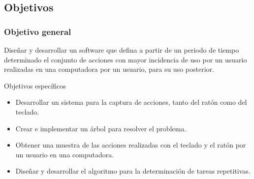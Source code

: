 \subsection{Objetivos} 
\begin{frame}
\frametitle{Objetivo general} 

Dise\~nar y desarrollar un software que defina a partir de un periodo de
 tiempo determinado el conjunto de acciones con mayor incidencia de uso por 
 un usuario realizadas en una computadora por un usuario, para su uso 
 posterior.

\begin{block}{Objetivos espec\'ificos} 			
\begin{itemize}
  \item Desarrollar un sistema para la captura de acciones, tanto del rat\'on
  como del teclado.
  \item Crear e implementar un \'arbol para resolver el problema.
  \item Obtener una muestra de las acciones realizadas con el teclado y el 
  rat\'on por un usuario en una computadora.
  \item Dise\~nar y desarrollar el algoritmo para la determinaci\'on de
  tareas repetitivas.
\end{itemize}
\end{block}
	
\end{frame}
